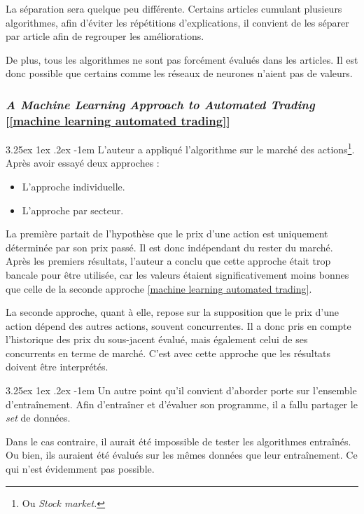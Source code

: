 \documentclass[a4paper, 11pt]{article}
\makeatletter
\newcounter{subsubsubsection}[subsubsection]
\renewcommand\paragraph{\@startsection{paragraph}{5}{\z@}%
  {3.25ex \@plus1ex \@minus.2ex}%
  {-1em}%
  {\normalfont\normalsize\bfseries}}
\makeatother
\begin{document}
La séparation sera quelque peu différente. Certains articles cumulant plusieurs algorithmes, afin d'éviter les répétitions d'explications, il convient de les séparer par article afin de regrouper les améliorations.

De plus, tous les algorithmes ne sont pas forcément évalués dans les articles. Il est donc possible que certains comme les réseaux de neurones n'aient pas de valeurs.

\subsubsection{\textit{A Machine Learning Approach to Automated Trading} [\ref{machine learning automated trading}]}

\paragraph{}
L'auteur a appliqué l'algorithme sur le marché des actions\footnote{Ou \textit{Stock market.}}. Après avoir essayé deux approches :
\begin{itemize}
\item L'approche individuelle.
\item L'approche par secteur.
\end{itemize}

La première partait de l'hypothèse que le prix d'une action est uniquement déterminée par son prix passé. Il est donc indépendant du rester du marché. Après les premiers résultats, l'auteur a conclu que cette approche était trop bancale pour être utilisée, car les valeurs étaient significativement moins bonnes que celle de la seconde approche \ref{machine learning automated trading}.

La seconde approche, quant à elle, repose sur la supposition que le prix d'une action dépend des autres actions, souvent concurrentes. Il a donc pris en compte l'historique des prix du sous-jacent évalué, mais également celui de ses concurrents en terme de marché.
C'est avec cette approche que les résultats doivent être interprétés.

\paragraph{}
Un autre point qu'il convient d'aborder porte sur l'ensemble d'entraînement. Afin d'entraîner et d'évaluer son programme, il a fallu partager le \textit{set} de données.

Dans le cas contraire, il aurait été impossible de tester les algorithmes entraînés. Ou bien, ils auraient été évalués sur les mêmes données que leur entraînement. Ce qui n'est évidemment pas possible.
\end{document}
